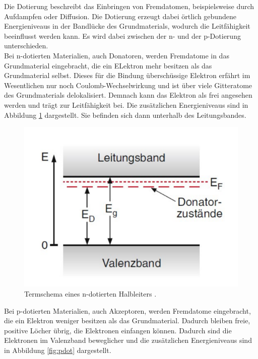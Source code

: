 Die Dotierung beschreibt das Einbringen von Fremdatomen, beispielsweise durch Aufdampfen oder Diffusion. Die Dotierung erzeugt dabei örtlich gebundene
Energieniveaus in der Bandlücke des Grundmaterials, wodurch die Leitfähigkeit beeinflusst werden kann. Es wird dabei zwischen der n- und der p-Dotierung 
unterschieden.\\
Bei n-dotierten Materialien, auch Donatoren, werden Fremdatome in das Grundmaterial eingebracht, die ein ELektron mehr besitzen als das Grundmaterial 
selbst. Dieses für die Bindung überschüssige Elektron erfährt im Wesentlichen nur noch Coulomb-Wechselwirkung und ist über viele Gitteratome des Grundmaterials
delokalisiert. Demnach kann das Elektron als frei angesehen werden und trägt zur Leitfähigkeit bei. Die zusätzlichen Energieniveaus sind in Abbildung \ref{fig:ndot}
dargestellt. Sie befinden sich dann unterhalb des Leitungsbandes.

\begin{figure}
    \centering
    \includegraphics[scale=0.3]{content/ndot.png}
    \caption{Termschema eines n-dotierten Halbleiters \cite{Dem}.}
    \label{fig:ndot}
\end{figure}

Bei p-dotierten Materialien, auch Akzeptoren, werden Fremdatome eingebracht, die ein Elektron weniger besitzen als das Grundmaterial. Dadurch bleiben 
freie, positive Löcher übrig, die Elektronen einfangen können. Dadurch sind die Elektronen im Valenzband beweglicher und die zusätzlichen Energieniveaus
sind in Abbildung \ref{fig:pdot} dargestellt.

